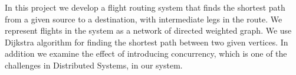 In this project we develop a flight routing system that finds the shortest path from a given source to a destination, with intermediate legs in the route. We represent flights in the system as a network of directed weighted graph. We use Dijkstra algorithm for finding the shortest path between two given vertices. In addition we examine the effect of introducing concurrency, which is one of the challenges in Distributed Systems, in our system.